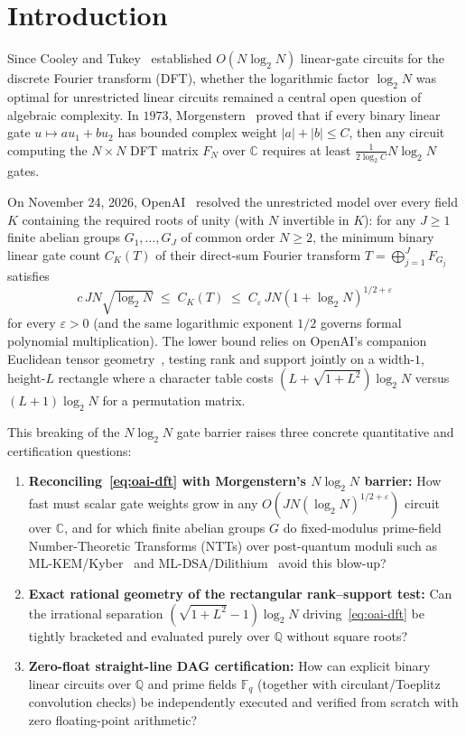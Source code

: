 \documentclass[11pt,a4paper]{article}
\theoremstyle{definition}
\theoremstyle{remark}
\newcommand{\QQ}{\mathbb{Q}}
\newcommand{\CC}{\mathbb{C}}
\newcommand{\FF}{\mathbb{F}}
\begin{document}
\section{Introduction}

Since Cooley and Tukey~\cite{cooley1965algorithm} established $O(N\log_2 N)$ linear-gate circuits for the discrete Fourier transform (DFT), whether the logarithmic factor $\log_2 N$ was optimal for unrestricted linear circuits remained a central open question of algebraic complexity. In $1973$, Morgenstern~\cite{morgenstern1973note} proved that if every binary linear gate $u \mapsto a u_1 + b u_2$ has bounded complex weight $|a| + |b| \le C$, then any circuit computing the $N\times N$ DFT matrix $F_N$ over $\CC$ requires at least $\frac{1}{2\log_2 C} N \log_2 N$ gates.

On November 24, 2026, OpenAI~\cite{openai2026dft} resolved the unrestricted model over every field $K$ containing the required roots of unity (with $N$ invertible in $K$): for any $J \ge 1$ finite abelian groups $G_1,\dots,G_J$ of common order $N \ge 2$, the minimum binary linear gate count $C_K(T)$ of their direct-sum Fourier transform $T = \bigoplus_{j=1}^J F_{G_j}$ satisfies
\begin{equation}\label{eq:oai-dft}
  c\, J N \sqrt{\log_2 N} \;\le\; C_K(T) \;\le\; C_\varepsilon\, J N (1 + \log_2 N)^{1/2+\varepsilon}
\end{equation}
for every $\varepsilon > 0$ (and the same logarithmic exponent $1/2$ governs formal polynomial multiplication). The lower bound relies on OpenAI's companion Euclidean tensor geometry~\cite{openai2026euclidean}, testing rank and support jointly on a width-$1$, height-$L$ rectangle where a character table costs $(L + \sqrt{1+L^2})\log_2 N$ versus $(L+1)\log_2 N$ for a permutation matrix.

This breaking of the $N\log_2 N$ gate barrier raises three concrete quantitative and certification questions:
\begin{enumerate}[leftmargin=1.8em,itemsep=2pt]
  \item \textbf{Reconciling~\eqref{eq:oai-dft} with Morgenstern's $N\log_2 N$ barrier:} How fast must scalar gate weights grow in any $O(JN(\log_2 N)^{1/2+\varepsilon})$ circuit over $\CC$, and for which finite abelian groups $G$ do fixed-modulus prime-field Number-Theoretic Transforms (NTTs) over post-quantum moduli such as ML-KEM/Kyber~\cite{nist2024mlkem} and ML-DSA/Dilithium~\cite{nist2024mldsa} avoid this blow-up?
  \item \textbf{Exact rational geometry of the rectangular rank--support test:} Can the irrational separation $(\sqrt{1+L^2}-1)\log_2 N$ driving~\eqref{eq:oai-dft} be tightly bracketed and evaluated purely over $\QQ$ without square roots?
  \item \textbf{Zero-float straight-line DAG certification:} How can explicit binary linear circuits over $\QQ$ and prime fields $\FF_q$ (together with circulant/Toeplitz convolution checks) be independently executed and verified from scratch with zero floating-point arithmetic?
\end{enumerate}
\end{document}

